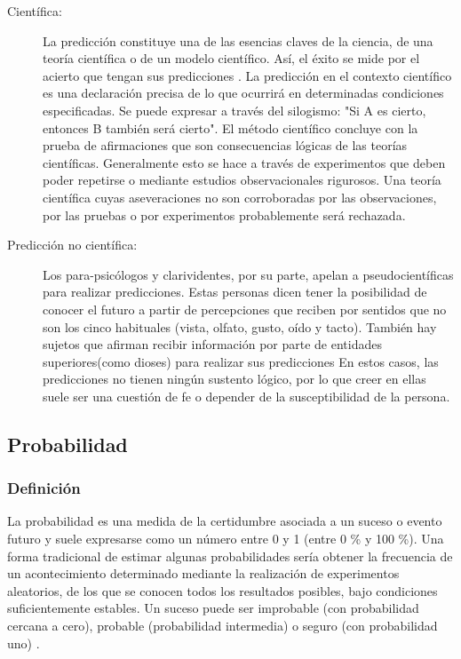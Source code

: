 \begin{description}
	\item [Científica:]
	\vskip 0.1cm 
	La predicción constituye una de las esencias claves de la ciencia, de una teoría científica o de un modelo científico. Así, el éxito se mide por el acierto que tengan sus predicciones \citep{mora_prediccion}.
	\vskip 0.1cm 
	La  predicción  en  el  contexto  científico  es  una  declaración  precisa  de  lo  que  ocurrirá  en determinadas  condiciones  especificadas.  Se  puede  expresar  a  través  del  silogismo:  "Si  A  es cierto, entonces B también será cierto".
	\vskip 0.1cm 
	El método científico concluye con la prueba de afirmaciones que son consecuencias lógicas de las teorías científicas. Generalmente esto se hace a través de experimentos que deben poder repetirse o mediante estudios observacionales rigurosos.
	\vskip 0.1cm 
	Una teoría científica cuyas aseveraciones no son corroboradas por las observaciones, por las pruebas o por experimentos probablemente será rechazada.
	 
	\item [Predicción no científica:]
	\vskip 0.1cm 
	Los para-psicólogos y clarividentes, por su parte, apelan a pseudocientíficas para realizar predicciones. Estas personas dicen tener la posibilidad de conocer el futuro a partir de percepciones que reciben por sentidos que no son los cinco habituales (vista, olfato, gusto, oído y tacto). También hay sujetos que afirman recibir información por parte de entidades superiores(como dioses) para realizar sus predicciones \citep{julian_maria}
	\vskip 0.1cm 
	En estos casos, las predicciones no tienen ningún sustento lógico, por lo que creer en ellas suele ser una cuestión de fe o depender de la susceptibilidad de la persona.
	
\end{description}	
	

\subsection{Probabilidad}

\subsubsection{Definición}

La probabilidad es una medida de la certidumbre asociada a un suceso o evento futuro y suele expresarse como un número entre 0 y 1 (entre 0 \% y 100 \%). 
\vskip 0.1cm 
Una forma tradicional de estimar algunas probabilidades sería obtener la frecuencia de un acontecimiento determinado mediante la realización de experimentos aleatorios, de los que se conocen todos los resultados posibles, bajo condiciones suficientemente estables. Un suceso puede ser improbable (con probabilidad cercana a cero), probable (probabilidad intermedia) o seguro (con probabilidad uno) \citep{loeve}.

